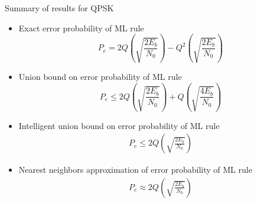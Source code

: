\documentclass[t]{beamer}
\begin{document}
\begin{frame}{Summary of results for QPSK}
  \footnotesize
  \begin{itemize}
    \item Exact error probability of ML rule
      \begin{equation*}
        P_{e} = 2Q\left(\sqrt{\frac{2E_b}{N_0} }\right) -Q^2\left(\sqrt{\frac{2E_b}{N_0} }\right) 
      \end{equation*}
    \item \pause Union bound on error probability of ML rule
      \begin{equation*}
        P_e  \leq  2Q\left(\sqrt{\frac{2E_b}{N_0} }\right) +Q\left(\sqrt{\frac{4E_b}{N_0} }\right) 
      \end{equation*}
    \item \pause Intelligent union bound on error probability of ML rule
      \begin{eqnarray*}
        P_e \leq 2Q\left(\sqrt{\frac{2E_b}{N_0} }\right)
      \end{eqnarray*}
    \item \pause Nearest neighbors approximation of error probability of ML rule
      \begin{eqnarray*}
        P_e \approx 2Q\left(\sqrt{\frac{2E_b}{N_0} }\right)
      \end{eqnarray*}
  \end{itemize}
  \normalsize
\end{frame}
\end{document}
